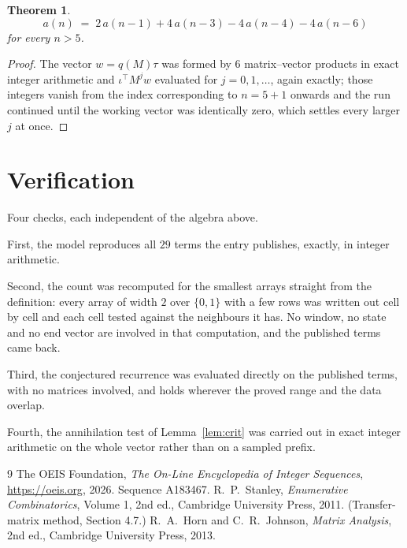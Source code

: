 \documentclass[11pt,a4paper]{article}
\theoremstyle{plain}
\newtheorem{theorem}{Theorem}
\theoremstyle{definition}
\begin{document}
\begin{theorem}
\[
a(n)\;=\;2\,a(n-1) + 4\,a(n-3) - 4\,a(n-4) - 4\,a(n-6)
\]
for every $n>5$.
\end{theorem}

\begin{proof}
The vector $w=q(M)\tau$ was formed by $6$ matrix--vector products in exact integer
arithmetic and $\iota^{\!\top}M^{j}w$ evaluated for $j=0,1,\dots$, again exactly; those
integers vanish from the index corresponding to $n=5+1$ onwards and the run continued
until the working vector was identically zero, which settles every larger $j$ at once.
\end{proof}

\section{Verification}

Four checks, each independent of the algebra above.

First, the model reproduces all $29$ terms the entry publishes, exactly, in integer
arithmetic.

Second, the count was recomputed for the smallest arrays straight from the definition: every
array of width $2$ over $\{0,1\}$ with a few rows was written out cell by cell and each cell
tested against the neighbours it has. No window, no state and no end vector are involved in that
computation, and the published terms came back.

Third, the conjectured recurrence was evaluated directly on the published terms, with no
matrices involved, and holds wherever the proved range and the data overlap.

Fourth, the annihilation test of Lemma~\ref{lem:crit} was carried out in exact integer
arithmetic on the whole vector rather than on a sampled prefix.

\begin{thebibliography}{9}
 The OEIS Foundation, \emph{The On-Line Encyclopedia of Integer
Sequences}, \url{https://oeis.org}, 2026. Sequence A183467.
 R.~P.~Stanley, \emph{Enumerative Combinatorics}, Volume 1, 2nd ed.,
Cambridge University Press, 2011. (Transfer-matrix method, Section 4.7.)
 R.~A.~Horn and C.~R.~Johnson, \emph{Matrix Analysis}, 2nd ed., Cambridge
University Press, 2013.
\end{thebibliography}
\end{document}
